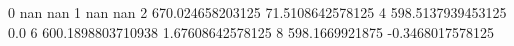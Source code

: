 0 nan nan
1 nan nan
2 670.024658203125 71.5108642578125
4 598.5137939453125 0.0
6 600.1898803710938 1.67608642578125
8 598.1669921875 -0.3468017578125
